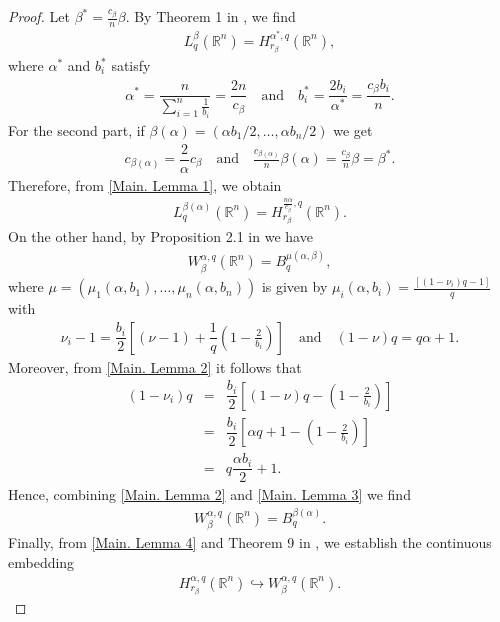 \documentclass[10pt, leqno]{article}
\theoremstyle{definition}
\theoremstyle{remark}
\numberwithin{equation}{section}
\begin{document}
\begin{proof}

Let $\beta^{\ast} = \frac{c_{\beta}}{n}\beta$. By Theorem 1 in \cite{LIZORKIN 2}, we find
\begin{eqnarray}
L^{\beta}_{q}(\mathbb{R}^{n}) = H_{r_{\beta^{}}}^{\alpha^{\ast}, q}(\mathbb{R}^{n}),
\end{eqnarray}
where $\alpha^{\ast}$ and $b^{\ast}_{i}$ satisfy
\begin{eqnarray}
\alpha^{\ast} = \dfrac{n}{\sum_{i=1}^{n}\frac{1}{b_{i}}} = \dfrac{2n}{c_{\beta}} \quad \text{and} \quad  b^{\ast}_{i} = \dfrac{2 b_{i}}{\alpha^{\ast}} = \dfrac{c_{\beta}b_{i}}{n}.
\end{eqnarray}
For the second part, if $\beta(\alpha) = (\alpha b_{1}/ 2, \dots, \alpha b_{n} / 2)$ we get
\begin{eqnarray}
c_{\beta(\alpha)} = \dfrac{2}{\alpha} c_{\beta} \quad \text{and} \quad \frac{c_{\beta(\alpha)}}{n}\beta(\alpha) = \frac{c_{\beta}}{n} \beta = \beta^{\ast}.
\end{eqnarray}
Therefore, from \eqref{Main. Lemma 1}, we obtain
\begin{eqnarray}
L^{\beta(\alpha)}_{q}(\mathbb{R}^{n}) = H_{r_{\beta^{}}}^{\frac{n \alpha}{c_{\beta}}, q}(\mathbb{R}^{n}).
\end{eqnarray}
On the other hand, by Proposition 2.1 in \cite{LEITAO LP} we have
\begin{eqnarray}
W_{\beta}^{\alpha, q}(\mathbb{R}^{n}) = B^{\mu(\alpha, \beta)}_{q},
\end{eqnarray}
where $\mu = (\mu_{1}(\alpha, b_{1}), \dots, \mu_{n}(\alpha, b_{n}))$ is given by $\mu_{i}(\alpha, b_{i}) = \frac{\left[(1 -\nu_{i})q -1 \right]}{q}$ with
\begin{eqnarray}
\label{Main. Lemma 2}
\nu_{i} - 1 = \dfrac{b_{i}}{2}\left[(\nu-1) + \dfrac{1}{q}\left( 1 - \frac{2}{b_{i}}\right)\right] \quad \text{and} \quad (1-\nu)q = q\alpha + 1.
\end{eqnarray}
Moreover, from \eqref{Main. Lemma 2} it follows that
\begin{eqnarray}
\label{Main. Lemma 3}
\left (1- \nu_{i}\right)q & = & \dfrac{b_{i}}{2}\left[(1-\nu)q - \left( 1 - \frac{2}{b_{i}}\right)\right] \\ \nonumber
& = & \dfrac{b_{i}}{2}\left[\alpha q + 1  - \left( 1 - \frac{2}{b_{i}}\right)\right] \\ \nonumber
& = & q \dfrac{\alpha b_{i}}{2} + 1.
\end{eqnarray}
Hence, combining \eqref{Main. Lemma 2} and \eqref{Main. Lemma 3} we find
\begin{eqnarray}
\label{Main. Lemma 4}
W_{\beta}^{\alpha, q}(\mathbb{R}^{n})= B^{\beta(\alpha)}_{q}.
\end{eqnarray}
Finally, from \eqref{Main. Lemma 4} and Theorem 9 in \cite{LIZORKIN 2}, we establish the continuous embedding
\begin{eqnarray}
H_{r_{\beta^{}}}^{\alpha, q}(\mathbb{R}^{n}) \hookrightarrow W_{\beta}^{\alpha, q}(\mathbb{R}^{n}).
\end{eqnarray}
\end{proof}
\end{document}
